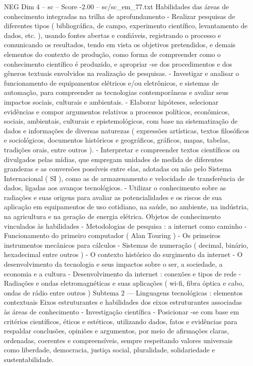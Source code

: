 \begin{textsample}{NEG Dim 4 – sc – Score -2.00 – sc/sc\_em\_77.txt}
Habilidades das áreas de conhecimento integradas na trilha de aprofundamento - Realizar pesquisas de diferentes tipos ( bibliográfica, de campo, experimento científico, levantamento de dados, etc. ), usando fontes abertas e confiáveis, registrando o processo e comunicando os resultados, tendo em vista os objetivos pretendidos, e demais elementos do contexto de produção, como forma de compreender como o conhecimento científico é produzido, e apropriar -se dos procedimentos e dos gêneros textuais envolvidos na realização de pesquisas. - Investigar e analisar o funcionamento de equipamentos elétricos e/ou eletrônicos, e sistemas de automação, para compreender as tecnologias contemporâneas e avaliar seus impactos sociais, culturais e ambientais. - Elaborar hipóteses, selecionar evidências e compor argumentos relativos a processos políticos, econômicos, sociais, ambientais, culturais e epistemológicos, com base na sistematização de dados e informações de diversas naturezas ( expressões artísticas, textos filosóficos e sociológicos, documentos históricos e geográficos, gráficos, mapas, tabelas, tradições orais, entre outros ). - Interpretar e compreender textos científicos ou divulgados pelas mídias, que empregam unidades de medida de diferentes grandezas e as conversões possíveis entre elas, adotadas ou não pelo Sistema Internacional ( SI ), como as de armazenamento e velocidade de transferência de dados, ligadas aos avanços tecnológicos. - Utilizar o conhecimento sobre as radiações e suas origens para avaliar as potencialidades e os riscos de sua aplicação em equipamentos de uso cotidiano, na saúde, no ambiente, na indústria, na agricultura e na geração de energia elétrica.
Objetos de conhecimento vinculados às habilidades - Metodologias de pesquisa : a internet como caminho - Funcionamento do primeiro computador ( Alan Touring ) - Os primeiros instrumentos mecânicos para cálculos - Sistemas de numeração ( decimal, binário, hexadecimal entre outros ) - O contexto histórico do surgimento da internet - O desenvolvimento da tecnologia e seus impactos sobre o ser, a sociedade, a economia e a cultura - Desenvolvimento da internet : conexões e tipos de rede - Radiações e ondas eletromagnéticas e suas aplicações ( wi-fi, fibra óptica e cabo, ondas de rádio entre outros ) Subtema 2 — Linguagens tecnológicas : elementos contextuais Eixos estruturantes e habilidades dos eixos estruturantes associadas às áreas de conhecimento - Investigação científica - Posicionar -se com base em critérios científicos, éticos e estéticos, utilizando dados, fatos e evidências para respaldar conclusões, opiniões e argumentos, por meio de afirmações claras, ordenadas, coerentes e compreensíveis, sempre respeitando valores universais como liberdade, democracia, justiça social, pluralidade, solidariedade e sustentabilidade.

\end{textsample}
